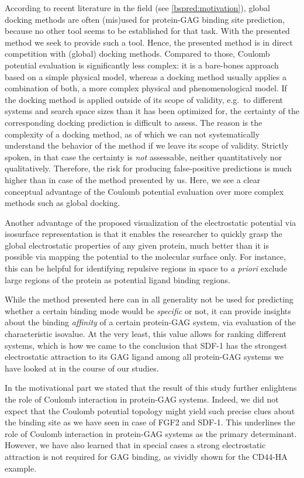 According to recent literature in the field (see \cref{bspred:motivation}),
global docking methods are often (mis)used for protein-GAG binding site
prediction, because no other tool seems to be established for that task. With
the presented method we seek to provide such a tool. Hence, the presented method
is in direct competition with (global) docking methods. Compared to those,
Coulomb potential evaluation is significantly less complex: it is a bare-bones
approach based on a simple physical model, whereas a docking method usually
applies a combination of both, a more complex physical and phenomenological
model. If the docking method is applied outside of its scope of validity, e.g.\
to different systems and search space sizes than it has been optimized for, the
certainty of the corresponding docking prediction is difficult to assess. The
reason is the complexity of a docking method, as of which we can not
systematically understand the behavior of the method if we leave its scope of
validity. Strictly spoken, in that case the certainty is \textit{not}
assessable, neither quantitatively nor qualitatively. Therefore, the risk for
producing false-positive predictions is much higher than in case of the method
presented by us. Here, we see a clear conceptual advantage of the Coulomb
potential evaluation over more complex methods such as global docking.

Another advantage of the proposed visualization of the electrostatic potential
via isosurface representation is that it enables the researcher to quickly grasp
the global electrostatic properties of any given protein, much better than it is
possible via mapping the potential to the molecular surface only. For instance,
this can be helpful for identifying repulsive regions in space to \textit{a
priori} exclude large regions of the protein as potential ligand binding
regions.

While the method presented here can in all generality not be used for predicting
whether a certain binding mode would be \textit{specific} or not, it can provide
insights about the binding \textit{affinity} of a certain protein-GAG system,
via evaluation of the characteristic isovalue. At the very least, this value
allows for ranking different systems, which is how we came to the conclusion
that SDF-1 has the strongest electrostatic attraction to its GAG ligand among
all protein-GAG systems we have looked at in the course of our studies.

In the motivational part we stated that the result of this study further
enlightens the role of Coulomb interaction in protein-GAG systems. Indeed, we
did not expect that the Coulomb potential topology might yield such precise
clues about the binding site as we have seen in case of FGF2 and SDF-1. This
underlines the role of Coulomb interaction in protein-GAG systems as the primary
determinant. However, we have also learned that in special cases a strong
electrostatic attraction is not required for GAG binding, as vividly shown for
the CD44-HA example.


